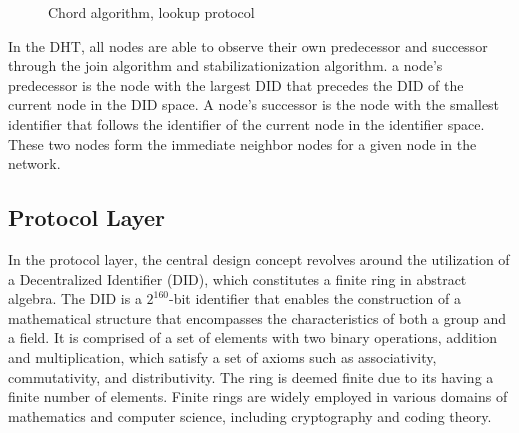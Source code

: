 \documentclass[twocolumn]{article}
\begin{document}
\begin{figure}[h]
    \begin{center}

    \end{center}

      \caption{Chord algorithm, lookup protocol}

    \end{figure}


    In the DHT, all nodes are able to observe their own predecessor and successor through the join algorithm and stabilizationization algorithm. a node's predecessor is the node with the largest DID that precedes the DID of the current node in the DID space. A node's successor is the node with the smallest identifier that follows the identifier of the current node in the identifier space. These two nodes form the immediate neighbor nodes for a given node in the network.

\subsection{Protocol Layer}

In the protocol layer, the central design concept revolves around the utilization of a Decentralized Identifier (DID), which constitutes a finite ring in abstract algebra. The DID is a $2^{160}$-bit identifier that enables the construction of a mathematical structure that encompasses the characteristics of both a group and a field. It is comprised of a set of elements with two binary operations, addition and multiplication, which satisfy a set of axioms such as associativity, commutativity, and distributivity. The ring is deemed finite due to its having a finite number of elements. Finite rings are widely employed in various domains of mathematics and computer science, including cryptography and coding theory.
\end{document}
